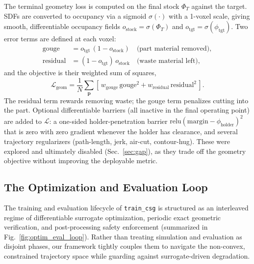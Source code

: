 The terminal geometry loss is computed on the final stock $\Phi_T$ against the
target. SDFs are converted to occupancy via a sigmoid $\sigma(\cdot)$ with a
1-voxel scale, giving smooth, differentiable occupancy fields
$o_{\mathrm{stock}} = \sigma(\Phi_T)$ and $o_{\mathrm{tgt}} = \sigma(\phi_{\mathrm{tgt}})$.
Two error terms are defined at each voxel:
\begin{align}
  \mathrm{gouge}    &= o_{\mathrm{tgt}}\,(1 - o_{\mathrm{stock}})  \quad \text{(part material removed)}, \\
  \mathrm{residual} &= (1 - o_{\mathrm{tgt}})\,o_{\mathrm{stock}}  \quad \text{(waste material left)},
\end{align}
and the objective is their weighted sum of squares,
\begin{equation}
  \label{eq:loss}
  \mathcal{L}_{\mathrm{geom}} = \frac{1}{N}\sum_{\mathbf{p}} \left[\, w_{\mathrm{gouge}}\,\mathrm{gouge}^2 + w_{\mathrm{residual}}\,\mathrm{residual}^2 \,\right].
\end{equation}
The residual term rewards removing waste; the gouge term penalizes cutting into
the part. Optional differentiable barriers (all inactive in the final operating
point) are added to $\mathcal{L}$: a one-sided holder-penetration barrier
$\mathrm{relu}(\mathrm{margin} - \phi_{\mathrm{holder}})^2$ that is zero with
zero gradient whenever the holder has clearance, and several trajectory
regularizers (path-length, jerk, air-cut, contour-hug). These were explored and
ultimately disabled (Sec.~\ref{sec:gap}), as they trade off the geometry
objective without improving the deployable metric.

\subsection{The Optimization and Evaluation Loop}
\label{sec:optim}

The training and evaluation lifecycle of \texttt{train\_csg} is structured as an interleaved regime of differentiable surrogate optimization, periodic exact geometric verification, and post-processing safety enforcement (summarized in Fig.~\ref{fig:optim_eval_loop}). Rather than treating simulation and evaluation as disjoint phases, our framework tightly couples them to navigate the non-convex, constrained trajectory space while guarding against surrogate-driven degradation.

